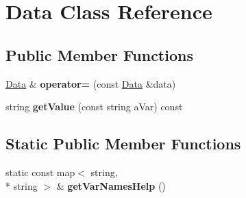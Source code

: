 \hypertarget{classData}{\section{Data Class Reference}
\label{classData}
}
\subsection*{Public Member Functions}
\begin{DoxyCompactItemize}
\item 
\hypertarget{classData_a1959550ffdd60408a174f2f9cd8ee2bd}{\hyperlink{classData}{Data} \& {\bfseries operator=} (const \hyperlink{classData}{Data} \&data)}\label{classData_a1959550ffdd60408a174f2f9cd8ee2bd}

\item 
\hypertarget{classData_a8a8a6c7d71ccb77a1ff4492db787996c}{string {\bfseries get\-Value} (const string a\-Var) const }\label{classData_a8a8a6c7d71ccb77a1ff4492db787996c}

\end{DoxyCompactItemize}
\subsection*{Static Public Member Functions}
\begin{DoxyCompactItemize}
\item 
\hypertarget{classData_abbc6642eda9d4960175ed812fb963fb3}{static const map$<$ string, \\*
string $>$ \& {\bfseries get\-Var\-Names\-Help} ()}\label{classData_abbc6642eda9d4960175ed812fb963fb3}

\end{DoxyCompactItemize}
